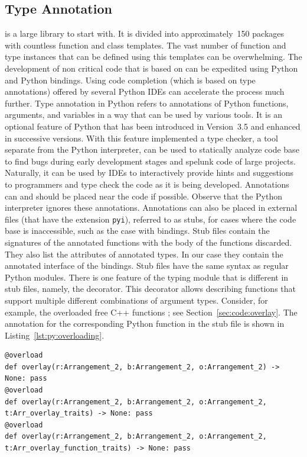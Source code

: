 \subsection{Type Annotation}
\label{ssec:concepts:annotation}
\cgal{} is a large library to start with. It is divided into approximately~150 packages with countless function and class templates. The vast number of function and type instances that can be defined using this templates can be overwhelming. The development of non critical code that is based on \cgal{} can be expedited using Python and \cgal{} Python bindings.  Using code completion (which is based on type annotations) offered by several Python IDEs can accelerate the process much further. Type annotation in Python refers to annotations of Python functions, arguments, and variables in a way that can be used by various tools. It is an optional feature of Python that has been introduced in Version~3.5 and enhanced in successive versions. With this feature implemented a type checker, a tool separate from the Python interpreter, can be used to statically analyze code base to find bugs during early development stages and spelunk code of large projects. Naturally, it can be used by IDEs to interactively provide hints and suggestions to programmers and type check the code as it is being developed. Annotations can and should be placed near the code if possible. Observe that the Python interpreter ignores these annotations. Annotations can also be placed in external files (that have the extension \lstinline{pyi}), referred to as stubs, for cases where the code base is inaccessible, such as the case with bindings. Stub files contain the signatures of the annotated functions with the body of the functions discarded. They also list the attributes of annotated types. In our case they contain the annotated interface of the \cgal{} bindings. Stub files have the same syntax as regular Python modules. There is one feature of the typing module that is different in stub files, namely, the  decorator. This decorator allows describing functions that support multiple different combinations of argument types. Consider, for example, the overloaded free C++ functions ; see Section~\ref{sec:code:overlay}. The annotation for the corresponding Python function  in the stub file is shown in Listing~\ref{lst:py:overloading}.

\begin{lstfloat}
\begin{lstlisting}[style=pythonFramedStyle,basicstyle=\scriptsize,%
                   label={lst:py:overloading},%
                   caption={Type annotation of the overloaded overlay function.}]
@overload
def overlay(r:Arrangement_2, b:Arrangement_2, o:Arrangement_2) -> None: pass
@overload
def overlay(r:Arrangement_2, b:Arrangement_2, o:Arrangement_2, t:Arr_overlay_traits) -> None: pass
@overload
def overlay(r:Arrangement_2, b:Arrangement_2, o:Arrangement_2, t:Arr_overlay_function_traits) -> None: pass
\end{lstlisting}
\end{lstfloat}

